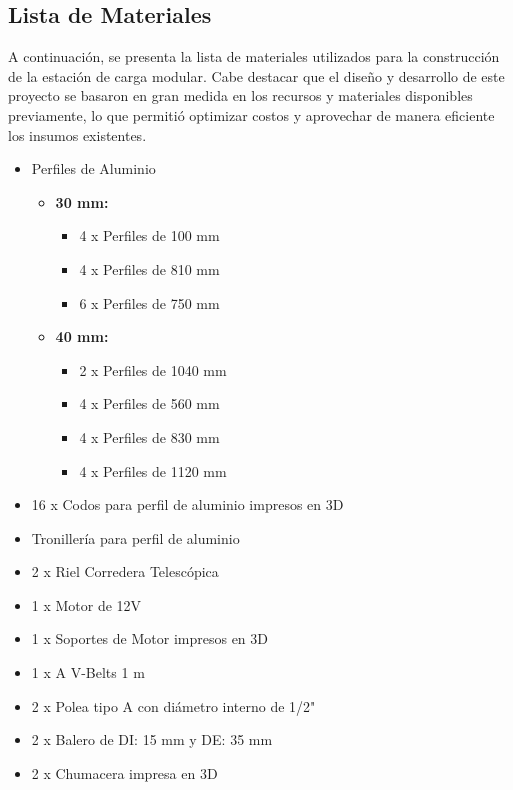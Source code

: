 \subsection{Lista de Materiales}
    A continuación, se presenta la lista de materiales utilizados para la construcción de la estación de carga modular. Cabe destacar que el diseño y desarrollo de este proyecto se basaron en gran medida en los recursos y materiales disponibles previamente, lo que permitió optimizar costos y aprovechar de manera eficiente los insumos existentes.
    \begin{itemize}
        \item Perfiles de Aluminio
            \begin{itemize}
                \item \textbf{30 mm:}
                \begin{itemize}
                \item 4 x Perfiles de 100 mm
                \item 4 x Perfiles de 810 mm
                \item 6 x Perfiles de 750 mm
                \end{itemize}
                \item \textbf{40 mm:}
                \begin{itemize}
                \item 2 x Perfiles de 1040 mm
                \item 4 x Perfiles de 560 mm
                \item 4 x Perfiles de 830 mm
                \item 4 x Perfiles de 1120 mm
                \end{itemize}
            \end{itemize}
        \item 16 x Codos para perfil de aluminio impresos en 3D
        \item Tronillería para perfil de aluminio
        \item 2 x Riel Corredera Telescópica
        \item 1 x Motor de 12V
        \item 1 x Soportes de Motor impresos en 3D
        \item 1 x A V-Belts 1 m 
        \item 2 x Polea tipo A con diámetro interno de 1/2"
        \item 2 x Balero de DI: 15 mm y DE: 35 mm
        \item 2 x Chumacera impresa en 3D

\end{itemize}
